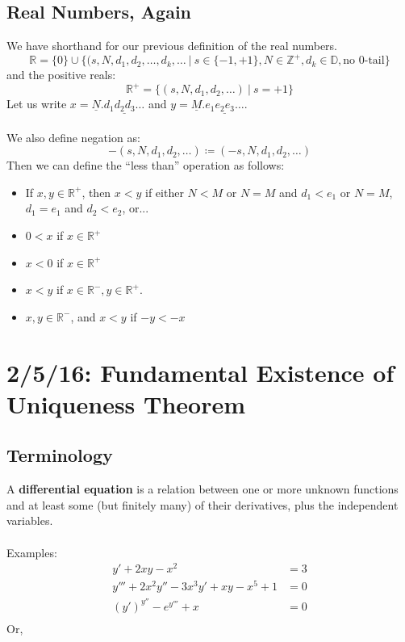 \documentclass[12pt]{article}
\begin{document}
\subsection{Real Numbers, Again}
We have shorthand for our previous definition of the real numbers.
\[ \mathbb{R} = \{0\} \cup \{(s,N,d_1,d_2,\dots, d_k,\dots \ | \ s \in \{-1,+1\}, N \in \mathbb{Z}^+, d_k \in \mathbb{D}, \text{no 0-tail} \}\]
and the positive reals: \[ \mathbb{R}^+ = \{(s,N,d_1,d_2,\dots) \ | \ s = +1\} \]
Let us write  $x = \underline{N}.\underline{d_1d_2d_3\dots}$ and $y = \underline{M}.\underline{e_1e_2e_3\dots}$. \\ \\
We also define negation as: \[ -(s,N,d_1,d_2,\dots) \coloneqq (-s,N,d_1,d_2,\dots) \]
Then we can define the ``less than'' operation as follows:
\begin{itemize}
\item If $x,y \in \mathbb{R}^+$, then $x<y$ if either $N < M$ or $N =M$ and $d_1 < e_1$ or $N = M$, $d_1 = e_1$ and $d_2 < e_2$, or...
\item $0<x$ if $x \in \mathbb{R}^+$
\item $x < 0$ if $x \in \mathbb{R}^+$
\item  $x<y$ if $x \in \mathbb{R}^-, y \in \mathbb{R}^+$. 
\item $x,y \in \mathbb{R}^-$, and $x<y$ if $-y < -x$
\end{itemize}

\section{2/5/16: Fundamental Existence of Uniqueness Theorem}

\subsection{Terminology}
A \textbf{differential equation} is a relation between one or more unknown functions and at least some (but finitely many) of their derivatives, plus the independent variables. \\ \\ Examples: 
\[ 
\begin{aligned}
y' + 2xy - x^2 &= 3 \\ 
y''' + 2x^2y'' - 3x^3y' +xy - x^5 + 1 &= 0 \\
(y')^{y''} - e^{y'''} + x &= 0 \\
\end{aligned}
\]
Or,
\end{document}
